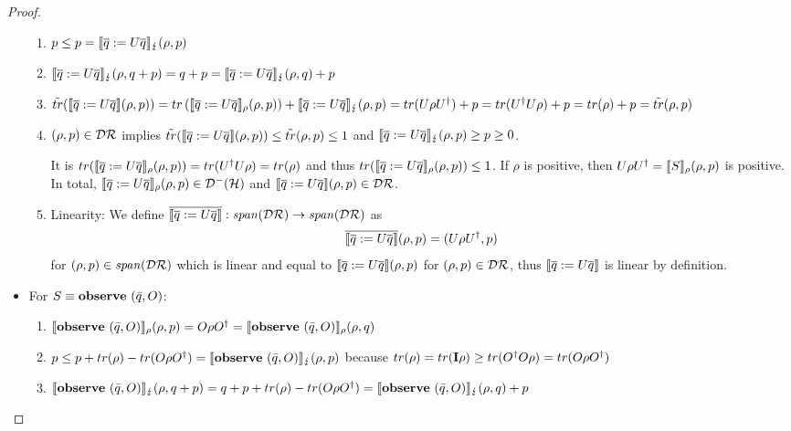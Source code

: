 \documentclass[a4paper,UKenglish,cleveref, autoref, thm-restate]{lipics-v2021}
\begin{document}
\begin{proof}
\begin{itemize}
\begin{enumerate}
            \item $p \leq p = \llbracket \overline{q}:= U\overline{q} \rrbracket_{\lightning}(\rho,p)$

            \item $\llbracket \overline{q}:= U\overline{q} \rrbracket_{\lightning}(\rho,q+p) =q+p = \llbracket \overline{q}:= U\overline{q} \rrbracket_{\lightning}(\rho,q) + p$

            \item $\tilde{tr}(\llbracket \overline{q}:= U\overline{q} \rrbracket(\rho,p)) = tr\left(\llbracket \overline{q}:= U\overline{q} \rrbracket_{\rho} (\rho,p)\right)+ \llbracket  \overline{q}:= U\overline{q} \rrbracket_{\lightning} (\rho,p) = tr(U\rho U^\dagger) +p = tr(U^\dagger U\rho ) +p  =tr(\rho)+p = \tilde{tr}(\rho,p)$

            \item $(\rho,p) \in \mathcal{D}\mathcal{R}$ implies $\tilde{tr}(\llbracket \overline{q}:= U\overline{q} \rrbracket(\rho,p))\leq \tilde{tr}(\rho,p)\leq 1$ and $ \llbracket \overline{q}:= U\overline{q} \rrbracket_{\lightning}(\rho,p) \geq p \geq 0$.

            It is $tr(\llbracket \overline{q}:= U\overline{q} \rrbracket_{\rho}(\rho,p)) = tr(U^\dagger U\rho ) = tr(\rho)$ and thus $tr(\llbracket \overline{q}:= U\overline{q} \rrbracket_{\rho}(\rho,p)) \leq 1$. If $\rho$ is positive, then $U\rho U^\dagger = \llbracket S \rrbracket_{\rho}(\rho,p)$ is positive. In total, $\llbracket \overline{q}:= U\overline{q} \rrbracket_{\rho}(\rho,p) \in \mathcal{D}^- (\mathcal{H})$ and $\llbracket \overline{q}:= U\overline{q} \rrbracket(\rho,p) \in \mathcal{D}\mathcal{R}$.

            \item Linearity:
            We define $\overline{\llbracket \overline{q}:= U\overline{q} \rrbracket}: \mathit{span}(\mathcal{D}\mathcal{R}) \to \mathit{span}(\mathcal{D}\mathcal{R})$ as
            \begin{align*}\overline{\llbracket \overline{q}:= U\overline{q} \rrbracket}(\rho,p) =(U \rho U^\dagger, p)
            \end{align*} for $(\rho,p) \in \mathit{span}(\mathcal{D}\mathcal{R})$ which is linear and equal to $\llbracket \overline{q}:= U\overline{q} \rrbracket(\rho,p)$ for $(\rho,p) \in \mathcal{D}\mathcal{R}$, thus $\llbracket \overline{q}:= U\overline{q} \rrbracket$ is linear by definition.


        \end{enumerate}
        \item For $S \equiv \mathbf{observe } \text{ }(\Bar{q},O)$:
        \begin{enumerate}
            \item $\llbracket \mathbf{observe } \text{ }(\Bar{q},O) \rrbracket_{\rho}(\rho,p) = O \rho O^\dagger = \llbracket \mathbf{observe } \text{ }(\Bar{q},O) \rrbracket_{\rho}(\rho,q)$

            \item $p \leq p+ tr(\rho)-tr(O \rho O^\dagger) = \llbracket \mathbf{observe } \text{ }(\Bar{q},O) \rrbracket_{\lightning}(\rho,p)$ because $tr(\rho) = tr(\textbf{I}\rho)\geq tr(O^\dagger O \rho) = tr(O \rho O^\dagger)$

            \item $\llbracket \mathbf{observe } \text{ }(\Bar{q},O) \rrbracket_{\lightning}(\rho,q+p) = q+p+tr(\rho)- tr(O\rho O^\dagger)  = \llbracket \mathbf{observe } \text{ }(\Bar{q},O) \rrbracket_{\lightning}(\rho,q) + p$


\end{enumerate}
\end{itemize}
\end{proof}
\end{document}
